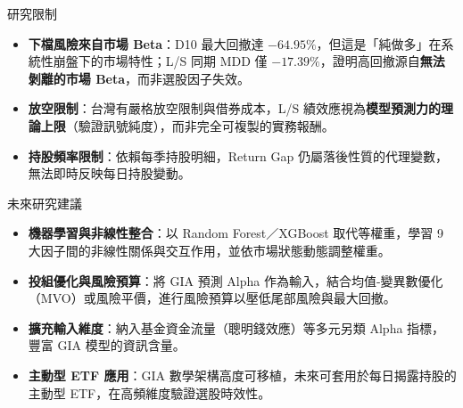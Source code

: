 \documentclass[aspectratio=169,11pt,t]{beamer}   %
\begin{document}
\begin{frame}{研究限制}
\vspace{0.25cm}
\begin{itemize}\setlength{\itemsep}{11pt}
  \item \textbf{下檔風險來自市場 Beta}：D10 最大回撤達 $-64.95\%$，但這是「純做多」在系統性崩盤下的市場特性；L/S 同期 MDD 僅 $-17.39\%$，證明高回撤源自\textbf{無法剝離的市場 Beta}，而非選股因子失效。
  \item \textbf{放空限制}：台灣有嚴格放空限制與借券成本，L/S 績效應視為\textbf{模型預測力的理論上限}（驗證訊號純度），而非完全可複製的實務報酬。
  \item \textbf{持股頻率限制}：依賴每季持股明細，Return Gap 仍屬落後性質的代理變數，無法即時反映每日持股變動。
\end{itemize}
\end{frame}

\begin{frame}{未來研究建議}
\vspace{0.25cm}
\begin{itemize}\setlength{\itemsep}{10pt}
  \item \textbf{機器學習與非線性整合}：以 Random Forest／XGBoost 取代等權重，學習 9 大因子間的非線性關係與交互作用，並依市場狀態動態調整權重。
  \item \textbf{投組優化與風險預算}：將 GIA 預測 Alpha 作為輸入，結合均值-變異數優化（MVO）或風險平價，進行風險預算以壓低尾部風險與最大回撤。
  \item \textbf{擴充輸入維度}：納入基金資金流量（聰明錢效應）等多元另類 Alpha 指標，豐富 GIA 模型的資訊含量。
  \item \textbf{主動型 ETF 應用}：GIA 數學架構高度可移植，未來可套用於每日揭露持股的主動型 ETF，在高頻維度驗證選股時效性。
\end{itemize}
\end{frame}
\end{document}
